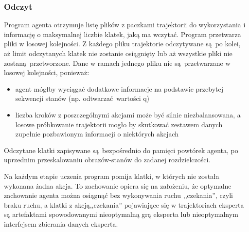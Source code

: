 \subsubsection{Odczyt}

Program agenta otrzymuje listę plików z paczkami trajektorii do wykorzystania i informację o maksymalnej liczbie klatek, jaką ma wczytać. Program przetwarza pliki w losowej kolejności. Z każdego pliku trajektorie odczytywane są po kolei, aż limit odczytanych klatek nie zostanie osiągnięty lub aż wszystkie pliki nie zostaną przetworzone.
Dane w ramach jednego pliku nie są przetwarzane w losowej kolejności, ponieważ:
\begin{itemize}
\item{agent mógłby wyciągać dodatkowe informacje na podstawie przebytej sekwencji stanów (np. odtwarzać wartości q)}
\item{liczba kroków z poszczególnymi akcjami może być silnie niezbalansowana, a losowe próbkowanie trajektorii mogło by skutkować zestawem danych zupełnie pozbawionym informacji o niektórych akcjach}
\end{itemize}
Odczytane klatki zapisywane są bezpośrednio do pamięci powtórek agenta, po uprzednim przeskalowaniu obrazów-stanów do zadanej rozdzielczości.

Na każdym etapie uczenia program pomija klatki, w których nie została wykonana żadna akcja. To zachowanie opiera się na założeniu, że optymalne zachowanie agenta można osiągnąć bez wykonywania ruchu ,,czekania'', czyli braku ruchu, a klatki z akcją,,czekania'' pojawiające się w trajektoriach eksperta są artefaktami spowodowanymi nieoptymalną grą eksperta lub nieoptymalnym interfejsem zbierania danych eksperta.

